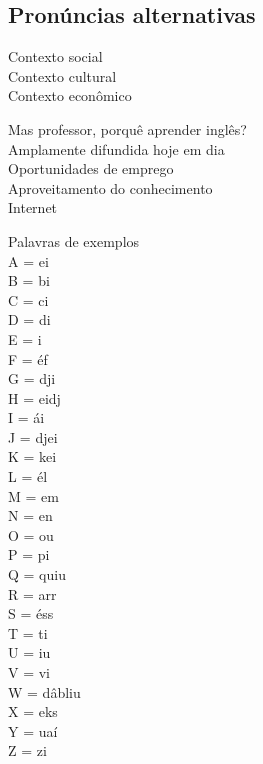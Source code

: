 \documentclass[12pt,a4paper]{article} %
\begin{document}
\subsection{Pronúncias alternativas}
Contexto social\\
Contexto cultural\\
Contexto econômico

Mas professor, porquê aprender inglês?\\
Amplamente difundida hoje em dia\\
Oportunidades de emprego\\
Aproveitamento do conhecimento\\
Internet

Palavras de exemplos\\
A = ei\\
B = bi\\
C = ci\\
D = di\\
E = i\\
F = éf\\
G = dji\\
H = eidj\\
I = ái\\
J = djei\\
K = kei\\
L = él\\
M = em\\
N = en\\
O = ou\\
P = pi\\
Q = quiu\\
R = arr\\
S = éss\\
T = ti\\
U = iu\\
V = vi\\
W = dâbliu\\
X = eks\\
Y = uaí\\
Z = zi
\end{document}
